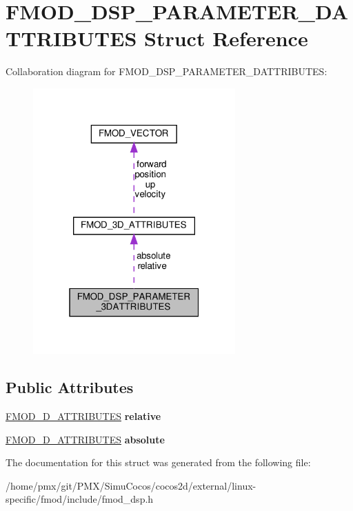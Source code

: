 \hypertarget{structFMOD__DSP__PARAMETER__3DATTRIBUTES}{}\section{F\+M\+O\+D\+\_\+\+D\+S\+P\+\_\+\+P\+A\+R\+A\+M\+E\+T\+E\+R\+\_\+D\+A\+T\+T\+R\+I\+B\+U\+T\+ES Struct Reference}
\label{structFMOD__DSP__PARAMETER__3DATTRIBUTES}


Collaboration diagram for F\+M\+O\+D\+\_\+\+D\+S\+P\+\_\+\+P\+A\+R\+A\+M\+E\+T\+E\+R\+\_\+D\+A\+T\+T\+R\+I\+B\+U\+T\+ES\+:
\nopagebreak
\begin{figure}[H]
\begin{center}
\leavevmode
\includegraphics[width=220pt]{structFMOD__DSP__PARAMETER__3DATTRIBUTES__coll__graph}
\end{center}
\end{figure}
\subsection*{Public Attributes}
\begin{DoxyCompactItemize}
\item 
\mbox{\label{structFMOD__DSP__PARAMETER__3DATTRIBUTES_ab96602490f518d16e671432a1106b7ac}} 
\hyperlink{structFMOD__3D__ATTRIBUTES}{F\+M\+O\+D\+\_\+D\+\_\+\+A\+T\+T\+R\+I\+B\+U\+T\+ES} {\bfseries relative}
\item 
\mbox{\label{structFMOD__DSP__PARAMETER__3DATTRIBUTES_aadffc13359d7bcfd558f1f4337b110fe}} 
\hyperlink{structFMOD__3D__ATTRIBUTES}{F\+M\+O\+D\+\_\+D\+\_\+\+A\+T\+T\+R\+I\+B\+U\+T\+ES} {\bfseries absolute}
\end{DoxyCompactItemize}


The documentation for this struct was generated from the following file\+:\begin{DoxyCompactItemize}
\item 
/home/pmx/git/\+P\+M\+X/\+Simu\+Cocos/cocos2d/external/linux-\/specific/fmod/include/fmod\+\_\+dsp.\+h\end{DoxyCompactItemize}
